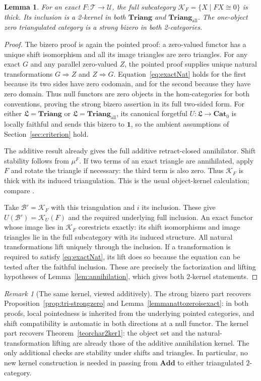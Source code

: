 \documentclass[11pt,reqno,a4paper]{amsart}
\newtheorem{lemma}[theorem]{Lemma}
\theoremstyle{definition}
\theoremstyle{remark}
\newtheorem{remark}[theorem]{Remark}
\newcommand{\T}{\mathcal{T}}
\newcommand{\U}{\mathcal{U}}
\newcommand{\0}{\mathbf{0}}
\renewcommand{\1}{\mathbf{1}}
\newcommand{\Triang}{\mathbf{Triang}}
\newcommand{\iso}{\cong}
\newcommand{\Pt}{\mathbf{Cat}_{0}}
\newcommand{\Add}{\mathbf{Add}}
\newcommand{\Tri}{\Triang}
\newcommand{\TriAll}{\mathbf{Triang}_{\mathrm{all}}}
\newcommand{\Lcat}{\mathfrak L}
\newcommand{\B}{\mathcal B}
\newcommand{\K}{\mathcal K}
\begin{document}
\begin{lemma}\label{lem:trikernel}
For an exact $F:\T\to\U$, the full subcategory
$\K_F=\{X\mid FX\iso0\}$ is thick. Its inclusion is a 2-kernel
in both $\Tri$ and $\TriAll$. The one-object zero triangulated
category is a strong bizero in both 2-categories.
\end{lemma}
\begin{proof}
The bizero proof is again the pointed proof: a zero-valued functor
has a unique shift isomorphism and all its image triangles are zero
triangles. For any exact $G$ and any parallel zero-valued $Z$, the
pointed proof supplies unique natural transformations $G\Rightarrow Z$
and $Z\Rightarrow G$. Equation~\eqref{eq:exactNat} holds for the
first because its two sides have zero codomain, and for the second
because they have zero domain. Thus null functors are zero objects
in the hom-categories for both conventions, proving the strong
bizero assertion in its full two-sided form. For either
$\Lcat=\Tri$ or $\Lcat=\TriAll$, its canonical forgetful
$U:\Lcat\to\Pt$ is locally faithful and sends this bizero
to $\mathbf1$, so the ambient assumptions of
Section~\ref{sec:criterion} hold.

The additive result already gives the full additive retract-closed
annihilator. Shift stability follows from $\mu^F$. If two terms of an
exact triangle are annihilated, apply $F$ and rotate the triangle
if necessary: the third term is also zero. Thus $\K_F$ is thick with
its induced triangulation. This is the usual object-kernel calculation;
compare \cite[Lemma 13.6.2, Tag 05RC]{StacksTriKernel}.

Take $\B'=\K_F$ with this triangulation and $i$ its inclusion.
These give $U(\B')=\mathcal K_U(F)$ and the required underlying
full inclusion. An exact functor whose image lies in $\K_F$
corestricts exactly: its shift isomorphisms and image triangles lie
in the full subcategory with its induced structure. All natural
transformations lift uniquely through the inclusion. If a transformation
is required to satisfy \eqref{eq:exactNat}, its lift does so because
the equation can be tested after the faithful inclusion. These are
precisely the factorization and lifting hypotheses of
Lemma~\ref{lem:annihilation}, which gives both $2$-kernel statements.
\end{proof}

\begin{remark}[The same kernel, viewed additively]
The strong bizero part recovers Proposition~\ref{prop:tri-strongzero}
and Lemma~\ref{lemmanattozeroisexact}: in both proofs, local
pointedness is inherited from the underlying pointed categories,
and shift compatibility is automatic in both directions at a
null functor. The kernel part recovers Theorem~\ref{teorchar2ker1}: the object set and the
natural-transformation lifting are already those of the additive
annihilation kernel. The only additional checks are stability under
shifts and triangles. In particular, no new kernel construction is
needed in passing from \(\Add\) to either triangulated \(2\)-category.
\end{remark}
\end{document}
